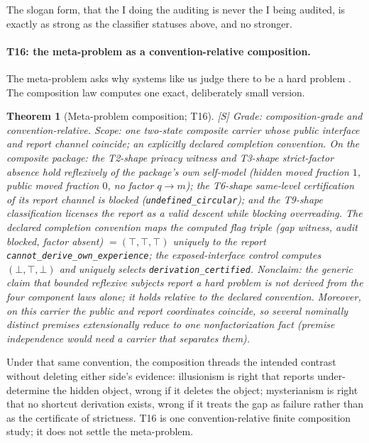 \documentclass[11pt]{article}
\newcommand{\gradeS}{\textsf{[S]}}
\newtheorem{theorem}{Theorem}[section]
\theoremstyle{definition}
\begin{document}
The slogan form, that the I doing the auditing is never the I being audited,
is exactly as strong as the classifier statuses above, and no stronger.

\paragraph{T16: the meta-problem as a convention-relative composition.}
The meta-problem asks why systems like us judge there to be a hard problem
\citep{Chalmers2018MetaProblem}. The composition law computes one exact,
deliberately small version.

\begin{theorem}[Meta-problem composition; T16]
\gradeS{} \emph{Grade:} composition-grade and convention-relative.
\emph{Scope:} one two-state composite carrier whose public interface and
report channel coincide; an explicitly declared completion convention. On the
composite package: the T2-shape privacy witness and T3-shape strict-factor
absence hold reflexively of the package's own self-model (hidden moved
fraction $1$, public moved fraction $0$, no factor $q \to m$); the T6-shape
same-level certification of its report channel is blocked
(\texttt{undefined\_circular}); and the T9-shape classification licenses the
report as a valid descent while blocking overreading. The declared completion
convention maps the computed flag triple (gap witness, audit blocked, factor
absent) $=(\top,\top,\top)$ uniquely to the report
\texttt{cannot\_derive\_own\_experience}; the exposed-interface control
computes $(\bot,\top,\bot)$ and uniquely selects
\texttt{derivation\_certified}. \emph{Nonclaim:} the generic claim that
bounded reflexive subjects report a hard problem is \emph{not} derived from
the four component laws alone; it holds relative to the declared
convention. Moreover, on this carrier the public and report coordinates coincide,
so several nominally distinct premises extensionally reduce to one
nonfactorization fact (premise independence would need a carrier that
separates them).
\end{theorem}

Under that same convention, the composition threads the intended contrast
without deleting either side's evidence: illusionism is right that reports
under-determine the hidden object, wrong if it deletes the object;
mysterianism is right that no shortcut derivation exists, wrong if it treats
the gap as failure rather than as the certificate of strictness. T16 is one
convention-relative finite composition study; it does not settle the
meta-problem.
\end{document}
